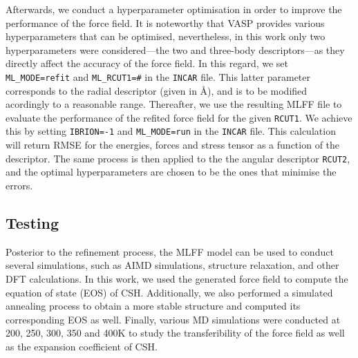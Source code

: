 Afterwards, we conduct a hyperparameter optimisation in order to improve the performance of the force field. It is noteworthy that VASP provides various hyperparameters that can be optimised, nevertheless, in this work only two hyperparameters were considered---the two and three-body descriptors---as they directly affect the accuracy of the force field. In this regard, we set \texttt{ML\_MODE=refit} and \texttt{ML\_RCUT1=\#} in the \texttt{INCAR} file. This latter parameter corresponds to the radial descriptor (given in \AA), and is to be modified acordingly to a reasonable range. Thereafter, we use the resulting MLFF file to evaluate the performance of the refited force field for the given \texttt{RCUT1}. We achieve this by setting \texttt{IBRION=-1} and \texttt{ML\_MODE=run} in the \texttt{INCAR} file. This calculation will return RMSE for the energies, forces and stress tensor as a function of the descriptor. The same process is then applied to the the angular descriptor \texttt{RCUT2}, and the optimal hyperparameters are chosen to be the ones that minimise the errors. 

\subsection{Testing}
Posterior to the refinement process, the MLFF model can be used to conduct several simulations, such as AIMD simulations, structure relaxation, and other DFT calculations. In this work, we used the generated force field to compute the equation of state (EOS) of CSH. Additionally, we also performed a simulated annealing process to obtain a more stable structure and computed its corresponding EOS as well. Finally, various MD simulations were conducted at 200, 250, 300, 350 and 400K to study the transferibility of the force field as well as the expansion coefficient of CSH.